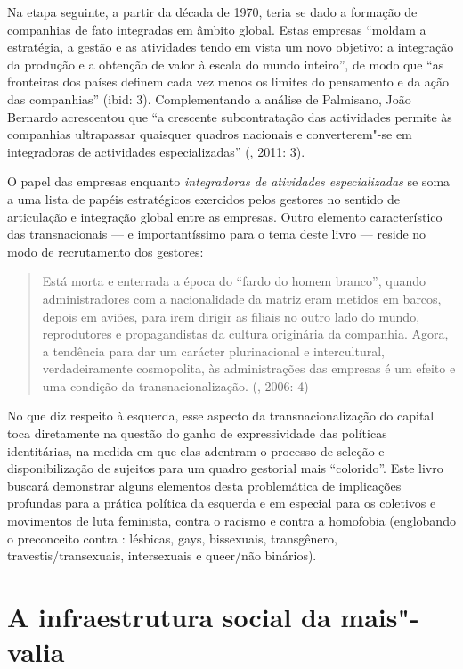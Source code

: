Na etapa seguinte, a partir da década de 1970, teria se dado a formação
de companhias de fato integradas em âmbito global. Estas empresas
``moldam a estratégia, a gestão e as atividades tendo em vista um novo
objetivo: a integração da produção e a obtenção de valor à escala do
mundo inteiro'', de modo que ``as fronteiras dos países definem cada vez
menos os limites do pensamento e da ação das companhias'' (ibid: 3).
Complementando a análise de Palmisano, João Bernardo acrescentou que ``a
crescente subcontratação das actividades permite às companhias
ultrapassar quaisquer quadros nacionais e converterem"-se em integradoras
de actividades especializadas'' (, 2011: 3).

O papel das empresas enquanto \emph{integradoras de atividades
especializadas} se soma a uma lista de papéis estratégicos exercidos
pelos gestores no sentido de articulação e integração global entre as
empresas. Outro elemento característico das transnacionais --- e
importantíssimo para o tema deste livro --- reside no modo de
recrutamento dos gestores:

\begin{quote}
Está morta e enterrada a época do ``fardo do homem branco'', quando
administradores com a nacionalidade da matriz eram metidos em barcos,
depois em aviões, para irem dirigir as filiais no outro lado do mundo,
reprodutores e propagandistas da cultura originária da companhia. Agora,
a tendência para dar um carácter plurinacional e intercultural,
verdadeiramente cosmopolita, às administrações das empresas é um efeito
e uma condição da transnacionalização. (, 2006: 4)
\end{quote}

No que diz respeito à esquerda, esse aspecto da transnacionalização do
capital toca diretamente na questão do ganho de expressividade das
políticas identitárias, na medida em que elas adentram o processo de
seleção e disponibilização de sujeitos para um quadro gestorial mais
``colorido''. Este livro buscará demonstrar alguns elementos desta
problemática de implicações profundas para a prática política da
esquerda e em especial para os coletivos e movimentos de luta feminista,
contra o racismo e contra a homofobia (englobando o preconceito contra
: lésbicas, gays, bissexuais, transgênero, travestis/transexuais,
intersexuais e queer/não binários).

\chapter{A infraestrutura social da mais"-valia}

